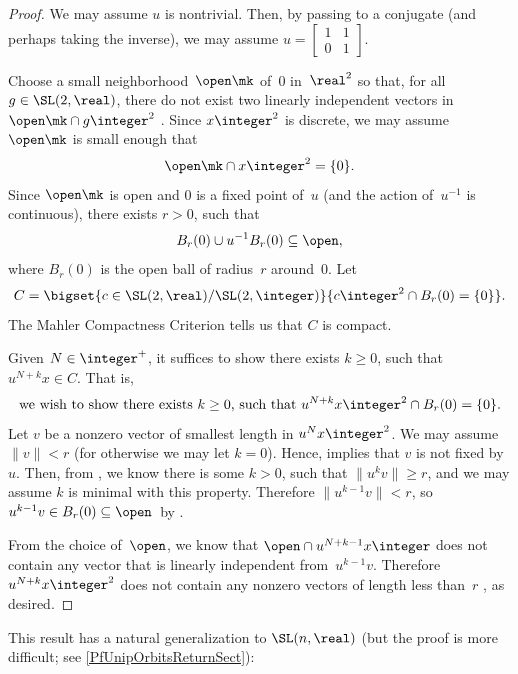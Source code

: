 \begin{proof}
We may assume $u$ is nontrivial. Then, by passing to a conjugate (and perhaps taking the inverse), we may assume $u = \left[\begin{smallmatrix} 1 & 1 \\ 0 & 1 \end{smallmatrix} \right]$.

Choose a small neighborhood~$\open\mk$ of~$0$ in~$\real^2$ so that, for all $g \in \SL(2,\real)$, there do not exist two linearly independent vectors in $\open\mk \cap g \integer^2$ . Since $x \integer^2$ is discrete, we may assume $\open\mk$ is small enough that 
	\begin{align} \label{OpenNotXZ2}
	\open\mk \cap x \integer^2 = \{0\}
	. \end{align}
Since $\open\mk$ is open and $0$ is a fixed point of~$u$ (and the action of~$u^{-1}$ is continuous), there exists $r > 0$, such that
	\begin{align} \label{uBrInOpen}
	 B_r(0) \cup u^{-1} B_r(0) \subseteq \open 
	 , \end{align}
where $B_r(0)$ is the open ball of radius~$r$ around~$0$.
Let 
	$$ C = \bigset{ c \in \SL(2,\real)/\SL(2,\integer) }{ c \integer^2 \cap B_r(0) = \{0\} } .$$
The Mahler Compactness Criterion  tells us that $C$ is compact.

Given $N \in \integer^+$, it suffices to show there exists $k \ge 0$, such that $u^{N+k} x \in C$. That is,
	$$\text{we wish to show there exists $k \ge 0$, such that $u^{N+k} x \integer^2 \cap B_r(0) = \{0\}$} . $$
Let $v$ be a nonzero vector of smallest length in $u^N x \integer^2$. We may assume $\|v\| < r$ (for otherwise we may let $k = 0$). Hence,  implies that $v$ is not fixed by~$u$. Then, from , we know there is some $k > 0$, such that $\|u^k v\| \ge r$, and we may assume $k$ is minimal with this property. Therefore $\|u^{k-1} v \|< r$, so $u^{k-1} v \in B_r(0) \subseteq \open$\, by .

From the choice of~$\open$, we know that $\open \cap u^{N+k-1} x \integer$ does not contain any vector that is linearly independent from~$u^{k-1} v$. Therefore $u^{N+k} x \integer^2$ does not contain any nonzero vectors of length less than~$r$ , as desired.
\end{proof}

This result has a natural generalization to $\SL(n,\real)$ (but the proof is more difficult; see \cref{PfUnipOrbitsReturnSect}):

